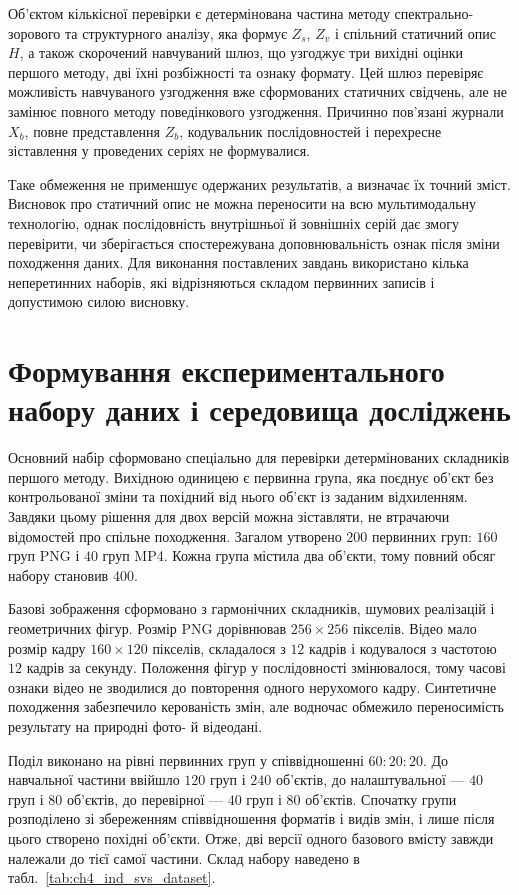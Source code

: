 

Об’єктом кількісної перевірки є детермінована частина методу спектрально-зорового та структурного аналізу, яка формує $Z_s$, $Z_v$ і спільний статичний опис $H$, а також скорочений навчуваний шлюз, що узгоджує три вихідні оцінки першого методу, дві їхні розбіжності та ознаку формату. Цей шлюз перевіряє можливість навчуваного узгодження вже сформованих статичних свідчень, але не замінює повного методу поведінкового узгодження. Причинно пов’язані журнали $X_b$, повне представлення $Z_b$, кодувальник послідовностей і перехресне зіставлення у проведених серіях не формувалися.

Таке обмеження не применшує одержаних результатів, а визначає їх точний зміст. Висновок про статичний опис не можна переносити на всю мультимодальну технологію, однак послідовність внутрішньої й зовнішніх серій дає змогу перевірити, чи зберігається спостережувана доповнювальність ознак після зміни походження даних. Для виконання поставлених завдань використано кілька неперетинних наборів, які відрізняються складом первинних записів і допустимою силою висновку.

\section{Формування експериментального набору даних і середовища досліджень}

Основний набір сформовано спеціально для перевірки детермінованих складників першого методу. Вихідною одиницею є первинна група, яка поєднує об’єкт без контрольованої зміни та похідний від нього об’єкт із заданим відхиленням. Завдяки цьому рішення для двох версій можна зіставляти, не втрачаючи відомостей про спільне походження. Загалом утворено $200$ первинних груп: $160$ груп PNG і $40$ груп MP4. Кожна група містила два об’єкти, тому повний обсяг набору становив $400$.

Базові зображення сформовано з гармонічних складників, шумових реалізацій і геометричних фігур. Розмір PNG дорівнював $256\times256$ пікселів. Відео мало розмір кадру $160\times120$ пікселів, складалося з $12$ кадрів і кодувалося з частотою $12$ кадрів за секунду. Положення фігур у послідовності змінювалося, тому часові ознаки відео не зводилися до повторення одного нерухомого кадру. Синтетичне походження забезпечило керованість змін, але водночас обмежило переносимість результату на природні фото- й відеодані.

Поділ виконано на рівні первинних груп у співвідношенні $60:20:20$. До навчальної частини ввійшло $120$ груп і $240$ об’єктів, до налаштувальної --- $40$ груп і $80$ об’єктів, до перевірної --- $40$ груп і $80$ об’єктів. Спочатку групи розподілено зі збереженням співвідношення форматів і видів змін, і лише після цього створено похідні об’єкти. Отже, дві версії одного базового вмісту завжди належали до тієї самої частини. Склад набору наведено в табл.~\ref{tab:ch4_ind_svs_dataset}.

